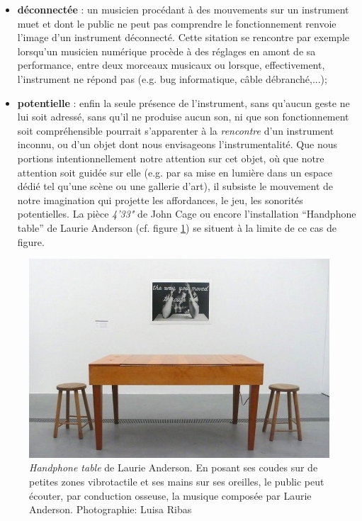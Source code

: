 \begin{itemize}[noitemsep]
	\item \textbf{déconnectée} : un musicien procédant à des mouvements sur un instrument muet et dont le public ne peut pas comprendre le fonctionnement renvoie l'image d'un instrument déconnecté. Cette sitation se rencontre par exemple lorsqu'un musicien numérique procède à des réglages en amont de sa performance, entre deux morceaux musicaux ou lorsque, effectivement, l'instrument ne répond pas (e.g. bug informatique, câble débranché,...);
	\item \textbf{potentielle} : enfin la seule présence de l'instrument, sans qu'aucun geste ne lui soit adressé, sans qu'il ne produise aucun son, ni que son fonctionnement soit compréhensible pourrait s'apparenter à la \textit{rencontre} d'un instrument inconnu, ou d'un objet dont nous envisageons l'instrumentalité. Que nous portions intentionnellement notre attention sur cet objet, où que notre attention soit guidée sur elle (e.g. par sa mise en lumière dans un espace dédié tel qu'une scène ou une gallerie d'art), il subsiste le mouvement de notre imagination qui projette les affordances, le jeu, les sonorités potentielles. La pièce \textit{4'33"} de John Cage ou encore l'installation ``Handphone table'' de Laurie Anderson (cf. figure \ref{fig:gesture:HandphoneTable}) se situent à la limite de ce cas de figure.
\end{itemize}
\begin{figure}[!htbp]
	\captionsetup{format=plain}%
	\includegraphics[width=\linewidth]{gfx/03_gesture/LaurieAnderson-HandphoneTable-PhotoLuisaRibas.jpg}
	\caption[\textit{Handphone table} de Laurie Anderson]{\textit{Handphone table} de Laurie Anderson. En posant ses coudes sur de petites zones vibrotactile et ses mains sur ses oreilles, le public peut écouter, par conduction osseuse, la musique composée par Laurie Anderson. Photographie: Luisa Ribas}
	\label{fig:gesture:HandphoneTable}
\end{figure}
